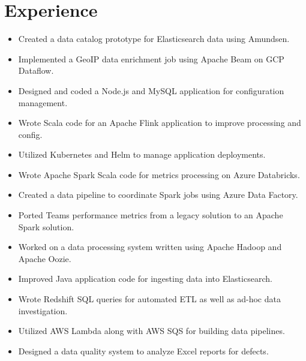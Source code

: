 \documentclass[letterpaper]{resume}
\begin{document}
\begin{minipage}[t]{0.72\columnwidth}


\section{Experience}

\begin{itemize}
\item Created a data catalog prototype for Elasticsearch data using Amundsen.
\item Implemented a GeoIP data enrichment job using Apache Beam on GCP Dataflow.
\item Designed and coded a Node.js and MySQL application for configuration management.
\item Wrote Scala code for an Apache Flink application to improve processing and config.
\item Utilized Kubernetes and Helm to manage application deployments.
\end{itemize}

\sectionspace

\begin{itemize}
\item Wrote Apache Spark Scala code for metrics processing on Azure Databricks.
\item Created a data pipeline to coordinate Spark jobs using Azure Data Factory.
\item Ported Teams performance metrics from a legacy solution to an Apache Spark solution.
\item Worked on a data processing system written using Apache Hadoop and Apache Oozie. 
\end{itemize}

\sectionspace

\begin{itemize}
\item Improved Java application code for ingesting data into Elasticsearch.
\item Wrote Redshift SQL queries for automated ETL as well as ad-hoc data investigation.
\item Utilized AWS Lambda along with AWS SQS for building data pipelines.
\item Designed a data quality system to analyze Excel reports for defects.
\end{itemize}


\end{minipage}
\end{document}
